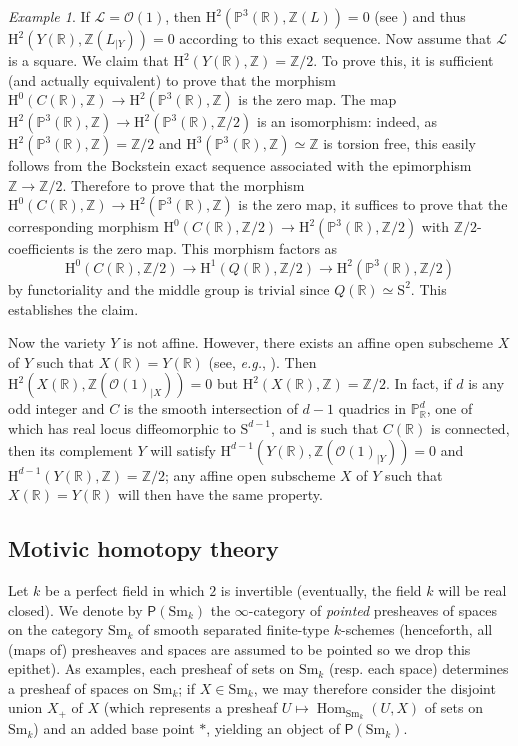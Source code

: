 \documentclass[11pt,leqno]{amsart}
\newcommand{\Hom}{\operatorname{Hom}}
\newcommand{\Osc}{{\mathscr{O}}}
\renewcommand{\1}{{\rm 1\hspace*{-0.4ex}%
\rule{0.1ex}{1.52ex}\hspace*{0.2ex}}}
\renewcommand{\Lc}{{\mathcal L}}
\newcommand{\Sm}{\mathrm{Sm}}
\newcommand{\Hr}{{\mathrm {H}}}
\newcommand{\<}[1]{{\langle}#1 {\rangle}}
\newcommand{\Rb}{\mathbb{R}}
\newcommand{\Zb}{\mathbb{Z}}
\newcommand{\Sr}{\mathrm{S}}
\theoremstyle{plain}
\theoremstyle{definition}
\theoremstyle{remark}
\newtheorem{ex}[thm]{Example}
\numberwithin{equation}{section}
\begin{document}
\begin{ex}
If $\Lc=\Osc(1)$, then $\Hr^2(\mathbb{P}^3(\Rb),\Zb(L))=0$ (see \cite[Lemma 1]{cadekCohomologyBON1999}) and thus $\Hr^2(Y(\Rb),\Zb(L_{|Y}))=0$ according to this exact sequence. Now assume that $\Lc$ is a square. We claim that $\Hr^2(Y(\Rb),\Zb)=\Zb/2$. To prove this, it is sufficient (and actually equivalent) to prove that the morphism $\Hr^0(C(\Rb),\Zb)\to\Hr^2(\mathbb{P}^3(\Rb),\Zb)$ is the zero map. The map $\Hr^2(\mathbb{P}^3(\Rb),\Zb)\to\Hr^2(\mathbb{P}^3(\Rb),\Zb/2)$ is an isomorphism: indeed, as $\Hr^2(\mathbb{P}^3(\Rb),\Zb)=\Zb/2$ and $\Hr^3(\mathbb{P}^3(\Rb),\Zb)\simeq\Zb$ is torsion free, this easily follows from the Bockstein exact sequence associated with the epimorphism $\Zb\to\Zb/2$. Therefore to prove that the morphism $\Hr^0(C(\Rb),\Zb)\to\Hr^2(\mathbb{P}^3(\Rb),\Zb)$ is the zero map, it suffices to prove that the corresponding morphism $\Hr^0(C(\Rb),\Zb/2)\to\Hr^2(\mathbb{P}^3(\Rb),\Zb/2)$ with $\Zb/2$-coefficients is the zero map. This morphism factors as \[\Hr^0(C(\Rb),\Zb/2)\to\Hr^1(Q(\Rb),\Zb/2)\to\Hr^2(\mathbb{P}^3(\Rb),\Zb/2)\] by functoriality and the middle group is trivial since $Q(\Rb)\simeq\Sr^2$. This establishes the claim.

Now the variety $Y$ is not affine. However, there exists an affine open subscheme $X$ of $Y$ such that $X(\Rb)=Y(\Rb)$ (see, \emph{e.g.}, \cite[Lemma 4.1.7]{asokSplittingVectorBundles2025}). Then $\Hr^2(X(\Rb),\Zb(\Osc(1)_{|X}))=0$ but $\Hr^2(X(\Rb),\Zb)=\Zb/2$. In fact, if $d$ is any odd integer and $C$ is the smooth intersection of $d-1$ quadrics in $\mathbb{P}_\Rb^d$, one of which has real locus diffeomorphic to $\Sr^{d-1}$, and is such that $C(\Rb)$ is connected, then its complement $Y$ will satisfy $\Hr^{d-1}(Y(\Rb),\Zb(\Osc(1)_{|Y}))=0$ and $\Hr^{d-1}(Y(\Rb),\Zb)=\Zb/2$; any affine open subscheme $X$ of $Y$ such that $X(\Rb)=Y(\Rb)$ will then have the same property.
\end{ex}

\subsection{Motivic homotopy theory}

Let $k$ be a perfect field in which $2$ is invertible (eventually, the field $k$ will be real closed). We denote by $\mathsf{P}(\Sm_k)$ the $\infty$-category of \emph{pointed} presheaves of spaces on the category $\Sm_k$ of smooth separated finite-type $k$-schemes (henceforth, all (maps of) presheaves and spaces are assumed to be pointed so we drop this epithet). As examples, each presheaf of sets on $\Sm_k$ (resp. each space) determines a presheaf of spaces on $\Sm_k$; if $X\in\Sm_k$, we may therefore consider the disjoint union $X_+$ of $X$ (which represents a presheaf $U\mapsto\Hom_{\Sm_k}(U,X)$ of sets on $\Sm_k$) and an added base point $*$, yielding an object of $\mathsf{P}(\Sm_k)$.
\end{document}
